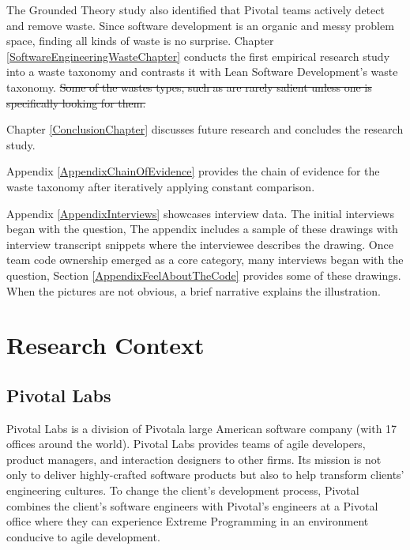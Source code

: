 The Grounded Theory study also identified that Pivotal teams actively detect and remove waste. Since software development is an organic and messy problem space, finding all kinds of waste is no surprise. Chapter \ref{SoftwareEngineeringWasteChapter} conducts the first empirical research study into a waste taxonomy and contrasts it with Lean Software Development’s waste taxonomy. \sout{Some of the wastes types, such as  are rarely salient unless one is specifically looking for them.}


Chapter \ref{ConclusionChapter} discusses future research and concludes the research study. 


Appendix \ref{AppendixChainOfEvidence} provides the chain of evidence for the waste taxonomy after iteratively applying constant comparison. 


Appendix \ref{AppendixInterviews} showcases interview data. The initial interviews began with the question,  The appendix includes a sample of these drawings with interview transcript snippets where the interviewee describes the drawing. Once team code ownership emerged as a core category, many interviews began with the question,  Section \ref{AppendixFeelAboutTheCode} provides some of these drawings. When the pictures are not obvious, a brief narrative explains the illustration.




\chapter{Research Context}
\label{ResearchContextChapter}


\section{Pivotal Labs}
Pivotal Labs is a division of Pivotal\textemdash a large American software company (with 17 offices around the world). Pivotal Labs provides teams of agile developers, product managers, and interaction designers to other firms. Its mission is not only to deliver highly-crafted software products but also to help transform clients' engineering cultures. To change the client's development process, Pivotal combines the client's software engineers with Pivotal's engineers at a Pivotal office where they can experience Extreme Programming \cite{BeckExtremeProgramming2004} in an environment conducive to agile development. 


